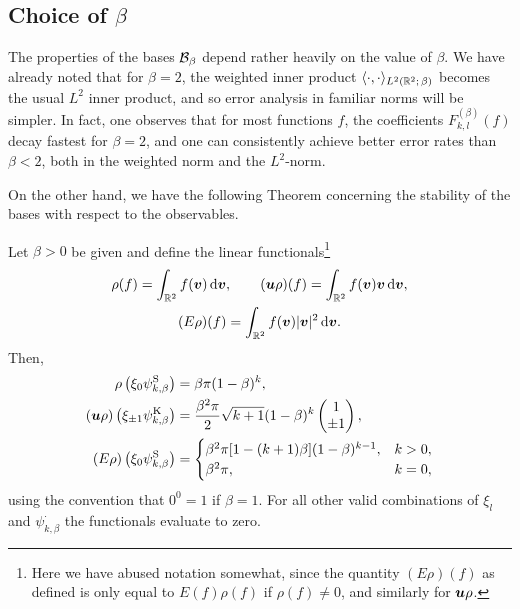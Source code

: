 \subsection{Choice of $\beta$}

The properties of the bases $\mathcal{B}_\beta$ depend rather heavily on the value of $\beta$. We have already noted
that for $\beta=2$, the weighted inner product $\langle\cdot,\cdot\rangle_{L^2(\mathbb{R}^2;\,\beta)}$ becomes the
usual $L^2$ inner product, and so error analysis in familiar norms will be simpler. In fact, one observes
that for most functions $f$, the coefficients $F_{k,l}^{(\beta)}(f)$ decay fastest for $\beta=2$, and one can
consistently achieve better error rates than $\beta<2$, both in the weighted norm and the $L^2$-norm.

On the other hand, we have the following Theorem concerning the stability of the bases with respect to the
observables.
\begin{theorem} \label{thm:polobs}
Let $\beta>0$ be given and define the linear functionals\footnote{Here we have abused notation somewhat, since
the quantity $(E\rho)(f)$ as defined is only equal to $E(f)\rho(f)$ if $\rho(f)\neq0$, and similarly for
${\bm u}\rho$.}
\begin{gather*}
    \rho(f) = \int_{\mathbb{R}^2} f({\bm v}) \,\mathrm{d}{\bm v}, \qquad
    ({\bm u} \rho)(f) = \int_{\mathbb{R}^2} f({\bm v}) {\bm v} \,\mathrm{d}{\bm v},\\
    (E \rho)(f) = \int_{\mathbb{R}^2} f({\bm v}) |{\bm v}|^2 \,\mathrm{d}{\bm v}.
\end{gather*}
Then,
\begin{align*}
    \rho\left(\xi_0\psi^{\mathrm{S}}_{k,\beta}\right) &= \beta\pi(1-\beta)^k, \\
    ({\bm u}\rho)\left(\xi_{\pm 1}\psi^{\mathrm{K}}_{k,\beta}\right) &= \frac{\beta^2\pi}{2}\sqrt{k+1}(1-\beta)^k
    \begin{pmatrix}1\\\pm1\end{pmatrix}, \\
    (E\rho)\left(\xi_0\psi^{\mathrm{S}}_{k,\beta}\right) &=
        \begin{cases}
            \beta^2\pi[1-(k+1)\beta](1-\beta)^{k-1}, & k>0, \\
            \beta^2\pi, & k=0,
        \end{cases}
\end{align*}
using the convention that $0^0=1$ if $\beta=1$. For all other valid combinations of $\xi_l$ and
$\psi^\cdot_{k,\beta}$ the functionals evaluate to zero.
\end{theorem}
